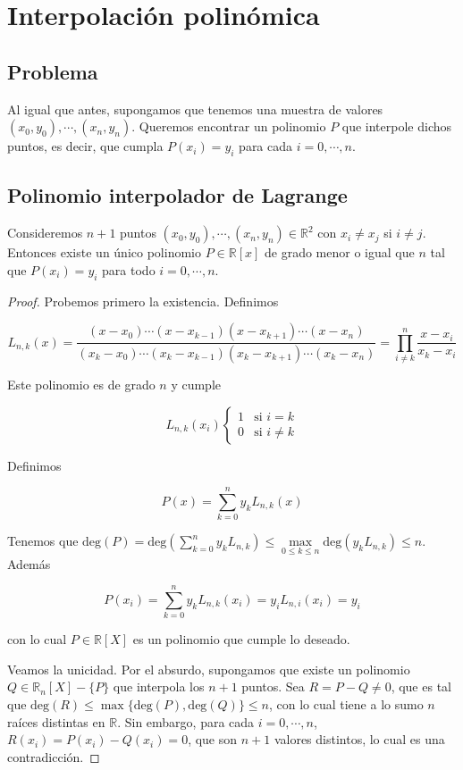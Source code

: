 \section{Interpolación polinómica}

\subsection{Problema}

Al igual que antes, supongamos que tenemos una muestra de valores $(x_0, y_0), \cdots, (x_n, y_n)$. Queremos encontrar un polinomio $P$ que interpole dichos puntos, es decir, que cumpla $P(x_i) = y_i$ para cada $i = 0, \cdots, n$.

\subsection{Polinomio interpolador de Lagrange}

\begin{teo}
Consideremos $n + 1$ puntos $(x_0, y_0), \cdots, (x_n, y_n) \in \mathbb{R}^2$ con $x_i \neq x_j$ si $i \neq j$. Entonces existe un único polinomio $P \in \mathbb{R}[x]$ de grado menor o igual que $n$ tal que $P(x_i) = y_i$ para todo $i = 0, \cdots, n$.

\begin{proof}
Probemos primero la existencia. Definimos

\[L_{n,k}(x) = \frac{(x - x_0) \cdots (x - x_{k - 1})(x - x_{k + 1}) \cdots (x - x_n)}{(x_k - x_0)\cdots (x_k - x_{k - 1})(x_k - x_{k + 1})\cdots (x_k - x_n)} = \prod_{i \neq k}^n \frac{x - x_i}{x_k - x_i}\]

Este polinomio es de grado $n$ y cumple

\[
L_{n,k}(x_i)
\left\{
	\begin{array}{ll}
		1  & \mbox{si } i = k \\
		0 & \mbox{si } i \neq k
	\end{array}
\right.
\]

Definimos

\[P(x) = \sum_{k = 0}^n y_k L_{n, k}(x)\]

Tenemos que $\text{deg}(P) = \text{deg}(\sum_{k = 0}^n y_k L_{n, k}) \leq \max \limits_{0 \leq k \leq n} \text{deg}(y_k L_{n, k}) \leq n$. Además

\[P(x_i) = \sum_{k = 0}^n y_k L_{n, k}(x_i) = y_i L_{n,i}(x_i) = y_i\]

con lo cual $P \in \mathbb{R}[X]$ es un polinomio que cumple lo deseado.

Veamos la unicidad. Por el absurdo, supongamos que existe un polinomio $Q \in \mathbb{R}_n[X] - \{P\}$ que interpola los $n + 1$ puntos. Sea $R = P - Q \neq 0$, que es tal que $\text{deg}(R) \leq \max\{\text{deg}(P), \text{deg}(Q)\} \leq n$, con lo cual tiene a lo sumo $n$ raíces distintas en $\mathbb{R}$. Sin embargo, para cada $i = 0, \cdots, n$, $R(x_i) = P(x_i) - Q(x_i) = 0$, que son $n + 1$ valores distintos, lo cual es una contradicción.
\end{proof}
\end{teo}

